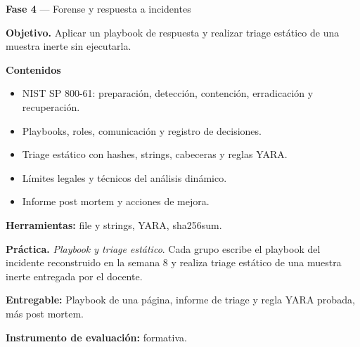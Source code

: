 \documentclass[11pt,a4paper]{article}
\begin{document}
\begin{tcolorbox}[cajaContenido,title={Semana 9 --- Respuesta a incidentes y triage estático de malware}]
\textbf{Fase 4} --- Forense y respuesta a incidentes

\textbf{Objetivo.} Aplicar un playbook de respuesta y realizar triage estático de una muestra inerte sin ejecutarla.

\textbf{Contenidos}

\begin{itemize}[leftmargin=1.4em,itemsep=2pt,topsep=3pt]
  \item NIST SP 800-61: preparación, detección, contención, erradicación y recuperación.
  \item Playbooks, roles, comunicación y registro de decisiones.
  \item Triage estático con hashes, strings, cabeceras y reglas YARA.
  \item Límites legales y técnicos del análisis dinámico.
  \item Informe post mortem y acciones de mejora.
\end{itemize}

\textbf{Herramientas:} file y strings, YARA, sha256sum.

\textbf{Práctica.} \emph{Playbook y triage estático}. Cada grupo escribe el playbook del incidente reconstruido en la semana 8 y realiza triage estático de una muestra inerte entregada por el docente.


\textbf{Entregable:} Playbook de una página, informe de triage y regla YARA probada, más post mortem.

\textbf{Instrumento de evaluación:} formativa.
\end{tcolorbox}
\end{document}
